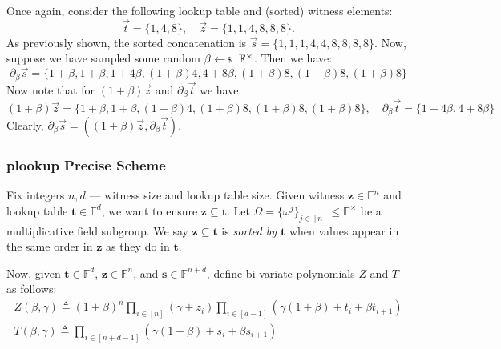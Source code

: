 \begin{example}
    Once again, consider the following lookup table and (sorted) witness elements:
    \begin{equation*}
        \vec{t} = \{1,4,8\}, \quad \vec{z} = \{1,1,4,8,8,8\}.
    \end{equation*}
    As previously shown, the sorted concatenation is $\vec{s}=\{1,1,1,4,4,8,8,8,8\}$. Now, suppose 
    we have sampled some random $\beta \leftarrowS \mathbb{F}^{\times}$. Then we have:
    \begin{equation*}
        \partial_{\beta}\vec{s} = \{1+\beta,1+\beta,1+4\beta,(1+\beta)4,4+8\beta,(1+\beta)8,(1+\beta)8,(1+\beta)8\}
    \end{equation*}
    Now note that for $(1+\beta)\vec{z}$ and $\partial_{\beta}\vec{t}$ we have:
    \begin{equation*}
        (1+\beta)\vec{z} = \{1+\beta,1+\beta,(1+\beta)4,(1+\beta)8,(1+\beta)8,(1+\beta)8\}, \quad \partial_{\beta}\vec{t} = \{1+4\beta,4+8\beta\}
    \end{equation*}
    Clearly, $\partial_{\beta}\vec{s} = ((1+\beta)\vec{z},\partial_{\beta}\vec{t})$.
\end{example}

\subsubsection{plookup Precise Scheme}

Fix integers $n,d$ --- witness size and lookup table size. Given witness
$\boldsymbol{z} \in \mathbb{F}^n$ and lookup table $\boldsymbol{t} \in
\mathbb{F}^d$, we want to ensure $\boldsymbol{z} \subseteq \boldsymbol{t}$. Let
$\Omega = \{\omega^j\}_{j \in [n]} \leq \mathbb{F}^{\times}$ be a multiplicative
field subgroup. We say $\boldsymbol{z} \subseteq \boldsymbol{t}$ is
\textit{sorted by $\boldsymbol{t}$} when values appear in the same order in
$\boldsymbol{z}$ as they do in $\boldsymbol{t}$. 

Now, given $\boldsymbol{t} \in \mathbb{F}^d$, $\boldsymbol{z} \in \mathbb{F}^n$,
and $\boldsymbol{s} \in \mathbb{F}^{n+d}$, define bi-variate polynomials $Z$ and
$T$ as follows:
\begin{gather*}
    Z(\beta,\gamma) \triangleq (1+\beta)^n \prod_{i \in [n]}(\gamma+z_i)\prod_{i \in [d-1]}(\gamma(1+\beta)+t_i+\beta t_{i+1}) \\
    T(\beta,\gamma) \triangleq \prod_{i \in [n+d-1]} (\gamma(1+\beta)+s_i+\beta s_{i+1})
\end{gather*}

